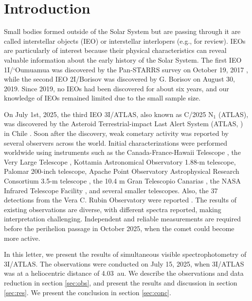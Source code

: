 \documentclass[]{pasj02}
\newcommand\I{3I/ATLAS\xspace}
\begin{document}
\section{Introduction}
Small bodies formed outside of the Solar System but are passing through it are called interstellar objects (IEO) or interstellar interlopers (e.g., \cite{Jewitt2023} for review).
IEOs are particularly of interest 
because their physical characteristics can reveal valuable information about the early history of the Solar System.
The first IEO 1I/`Oumuamua was discovered by the Pan-STARRS survey \citep{Chambers2016} on October 19, 2017 \citep{Meech2017}, while the second IEO 2I/Borisov was discovered by G. Borisov on August 30, 2019.
Since 2019, no IEOs had been discovered for about six years, and our knowledge of IEOs remained limited due to the small sample size.

On July 1st, 2025, the third IEO 3I/ATLAS, also known as C/2025 N$_1$ (ATLAS), was discovered by the Asteroid Terrestrial-impact Last Alert System (ATLAS, \cite{Tonry2018}) in Chile \citep{Denneau2025}.
Soon after the discovery, weak cometary activity was reported by several observers across the world.
Initial characterizations were performed worldwide using instruments such as the Canada-France-Hawaii Telescope  \citep{Seligman2025_3I}, the Very Large Telescope \citep{Seligman2025_3I, Opitom2025_3I, Alvarez-Candal2025_3I}, 
Kottamia Astronomical Observatory 1.88-m telescope, Palomar 200-inch telescope, Apache Point Observatory Astrophysical Research Consortium 3.5-m telescope \citep{Bolin2025_3I, Belyakov2025_3I}, the 10.4 m Gran Telescopio Canarias \citep{Marcos2025_3I}, the NASA Infrared Telescope Facility \citep{Kareta2025_3I}, and several smaller telescopes.
Also, the 37 detections from the Vera C. Rubin Observatory were reported \citep{Chandler2025_3I}.
The results of existing observations are diverse, with different spectra reported, making interpretation challenging.
Independent and reliable measurements are required before the perihelion passage in October 2025, when the comet could become more active.

In this letter, we present the results of simultaneous visible spectrophotometry of \I.
The observations were conducted on July 15, 2025, when \I was at a heliocentric distance of 4.03~au.
We describe the observations and data reduction in section \ref{sec:obs}, and present the results and discussion in section \ref{sec:res}.
We present the conclusion in section \ref{sec:conc}.
\end{document}
